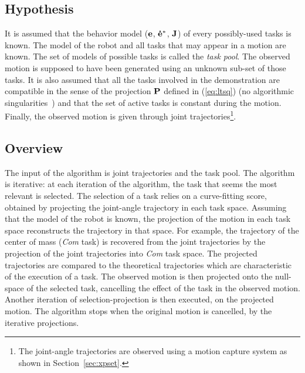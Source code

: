 \documentclass[journal]{IEEEtran}
\begin{document}
\subsection{Hypothesis}
It is assumed that the behavior model (${\mathbf{e}}$, ${\mathbf{\dot{e}^*}}$, ${\mathbf{J}}$) of every
possibly-used tasks is known. The model of the robot and all tasks that may appear in a 
motion are known. The set of models of possible tasks is called the \emph{task pool}.
The observed motion is supposed to have been generated using an unknown sub-set of those tasks.  
It is also assumed that all the tasks involved in the demonstration are compatible
in the sense of the projection ${\mathbf{P}}$ defined in (\ref{eq:ltsq})
(no algorithmic singularities~\cite{chiaverini97}) and that the set
of active tasks is constant during the motion.
Finally, the observed motion is given through
joint trajectories\footnote{The joint-angle trajectories are observed using a motion
capture system as shown in Section~\ref{sec:xpset}.}.

\subsection{Overview}
\label{sec:alg1:selec}
The input of the algorithm is joint trajectories and
the task pool. The algorithm is iterative: at each iteration of the algorithm, the task that seems the
most relevant is selected. The selection of a task relies
on a curve-fitting score, obtained by projecting the joint-angle trajectory in each task space.
Assuming that the model of the robot is known,
the projection of the motion in each task space reconstructs the trajectory in that space.
For example, the trajectory of the center of mass (\emph{Com} task) is 
recovered from the joint trajectories by the projection
of the joint trajectories into \emph{Com} task space. 
The projected trajectories are
compared to the theoretical trajectories which are characteristic
of the execution of a task.
The observed motion is then projected
onto the null-space of the selected task, cancelling the effect of the task in the observed motion.
Another iteration of selection-projection is then executed, on the projected motion.
The algorithm stops when the original motion is cancelled, by the iterative projections.
\newcommand{\shOUTPUT}{\textbf{Output: }}
\newcommand{\shINPUT}{\textbf{Input: }}
\end{document}
